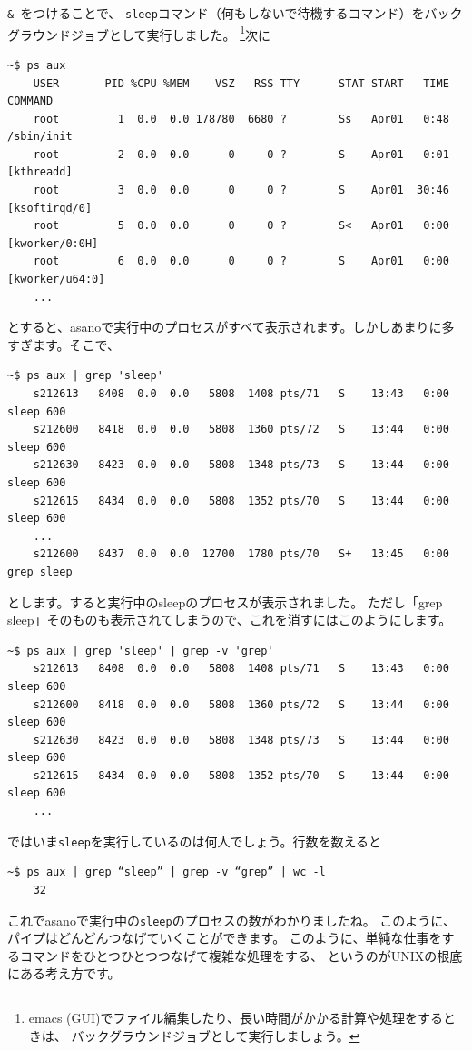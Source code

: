 \documentclass[a4j]{ltjsreport}
\begin{document}
    \texttt{\& }をつけることで、
    \texttt{sleep}コマンド（何もしないで待機するコマンド）をバックグラウンドジョブとして実行しました。
    \footnote{emacs (GUI)でファイル編集したり、長い時間がかかる計算や処理をするときは、
    バックグラウンドジョブとして実行しましょう。}次に
    \begin{lstlisting}[numbers=none]
    ~$ ps aux 
    USER       PID %CPU %MEM    VSZ   RSS TTY      STAT START   TIME COMMAND
    root         1  0.0  0.0 178780  6680 ?        Ss   Apr01   0:48 /sbin/init
    root         2  0.0  0.0      0     0 ?        S    Apr01   0:01 [kthreadd]
    root         3  0.0  0.0      0     0 ?        S    Apr01  30:46 [ksoftirqd/0]
    root         5  0.0  0.0      0     0 ?        S<   Apr01   0:00 [kworker/0:0H]
    root         6  0.0  0.0      0     0 ?        S    Apr01   0:00 [kworker/u64:0]
    ...
    \end{lstlisting}
    とすると、asanoで実行中のプロセスがすべて表示されます。しかしあまりに多すぎます。そこで、
    \begin{lstlisting}[numbers=none]
    ~$ ps aux | grep 'sleep'
    s212613   8408  0.0  0.0   5808  1408 pts/71   S    13:43   0:00 sleep 600
    s212600   8418  0.0  0.0   5808  1360 pts/72   S    13:44   0:00 sleep 600
    s212630   8423  0.0  0.0   5808  1348 pts/73   S    13:44   0:00 sleep 600
    s212615   8434  0.0  0.0   5808  1352 pts/70   S    13:44   0:00 sleep 600
    ...
    s212600   8437  0.0  0.0  12700  1780 pts/70   S+   13:45   0:00 grep sleep
    \end{lstlisting}
    とします。すると実行中のsleepのプロセスが表示されました。
    ただし「grep sleep」そのものも表示されてしまうので、これを消すにはこのようにします。
    \begin{lstlisting}[numbers=none]
    ~$ ps aux | grep 'sleep' | grep -v 'grep'
    s212613   8408  0.0  0.0   5808  1408 pts/71   S    13:43   0:00 sleep 600
    s212600   8418  0.0  0.0   5808  1360 pts/72   S    13:44   0:00 sleep 600
    s212630   8423  0.0  0.0   5808  1348 pts/73   S    13:44   0:00 sleep 600
    s212615   8434  0.0  0.0   5808  1352 pts/70   S    13:44   0:00 sleep 600
    ...
    \end{lstlisting}
    ではいま\texttt{sleep}を実行しているのは何人でしょう。行数を数えると
    \begin{lstlisting}[numbers=none]
    ~$ ps aux | grep “sleep” | grep -v “grep” | wc -l
    32
    \end{lstlisting}

    これでasanoで実行中の\texttt{sleep}のプロセスの数がわかりましたね。
    このように、パイプはどんどんつなげていくことができます。
    このように、単純な仕事をするコマンドをひとつひとつつなげて複雑な処理をする、
    というのがUNIXの根底にある考え方です。
    
\end{document}
